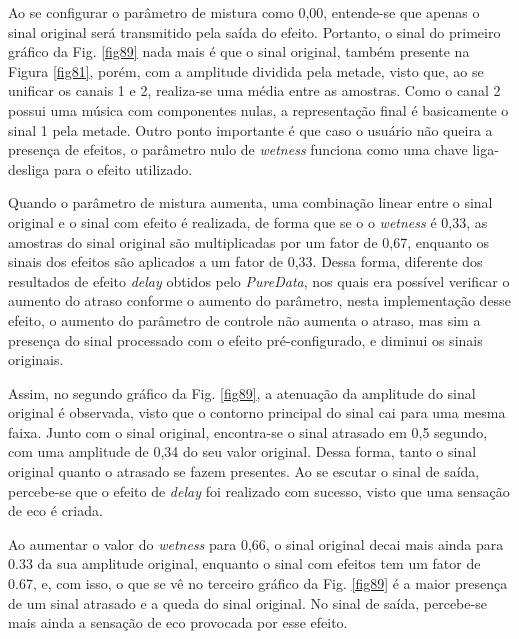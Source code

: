 Ao se configurar o parâmetro de mistura como 0,00, entende-se que apenas o sinal original será transmitido pela saída do efeito. Portanto, o sinal do primeiro gráfico da Fig. \ref{fig89} nada mais é que o sinal original, também presente na Figura \ref{fig81}, porém, com a amplitude dividida pela metade, visto que, ao se unificar os canais 1 e 2, realiza-se uma média entre as amostras. Como o canal 2 possui uma música com componentes nulas, a representação final é basicamente o sinal 1 pela metade. Outro ponto importante é que caso o usuário não queira a presença de efeitos, o parâmetro nulo de \textit{wetness} funciona como uma chave liga-desliga para o efeito utilizado. 


Quando o parâmetro de mistura aumenta, uma combinação linear entre o sinal original e o sinal com efeito é realizada, de forma que se o o \textit{wetness} é 0,33, as amostras do sinal original são multiplicadas por um fator de 0,67, enquanto os sinais dos efeitos são aplicados a um fator de 0,33. Dessa forma, diferente dos resultados de efeito \textit{delay} obtidos pelo \textit{PureData}, nos quais era possível verificar o aumento do atraso conforme o aumento do parâmetro, nesta implementação desse efeito, o aumento do parâmetro de controle não aumenta o atraso, mas sim a presença do sinal processado com o efeito pré-configurado, e diminui os sinais originais. 

Assim, no segundo gráfico da Fig. \ref{fig89}, a atenuação da amplitude do sinal original é observada, visto que o contorno principal do sinal cai para uma mesma faixa. Junto com o sinal original, encontra-se o sinal atrasado em 0,5 segundo, com uma amplitude de 0,34 do seu valor original. Dessa forma, tanto o sinal original quanto o atrasado se fazem presentes. Ao se escutar o sinal de saída, percebe-se que o efeito de \textit{delay} foi realizado com sucesso, visto que uma sensação de eco é criada. 


Ao aumentar o valor do \textit{wetness} para 0,66, o sinal original decai mais ainda para 0.33 da sua amplitude original, enquanto o sinal com efeitos tem um fator de 0.67, e, com isso, o que se vê no terceiro gráfico da Fig. \ref{fig89} é a maior presença de um sinal atrasado e a queda do sinal original. No sinal de saída, percebe-se mais ainda a sensação de eco provocada por esse efeito.

